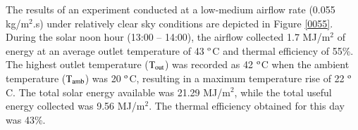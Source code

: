 The results of an experiment conducted at a low-medium airflow rate (0.055 kg/m$^2$.s) under relatively clear sky conditions are depicted in Figure \ref{0055}. During the solar noon hour (13:00 -- 14:00), the airflow collected 1.7 MJ/m$^2$ of energy at an average outlet temperature of 43 $^{\rm{o}}$C and thermal efficiency of 55\%. The highest outlet temperature ($\rm{T_{out}}$) was recorded as 42 $^{\rm{o}}$C when the ambient temperature ($\rm{T_{amb}}$) was 20 $^{\rm{o}}$C, resulting in a maximum temperature rise of 22 $^{\rm{o}}$C. The total solar energy available was 21.29 MJ/m$^2$, while the total useful energy collected was 9.56 MJ/m$^2$. The thermal efficiency obtained for this day was 43\%.




